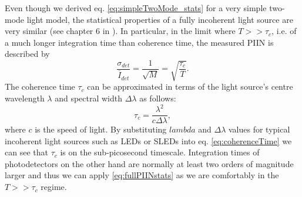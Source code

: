 \documentclass[]{article}
\newcommand*\mean[1]{\overline{#1}}
\begin{document}
	Even though we derived  eq. \ref{eq:simpleTwoMode_stats} for a very simple two-mode light model, the statistical properties of a fully incoherent light source are very similar (see chapter 6 in \cite{goodman_statistical_2000}). In particular, in the limit where $T>>\tau_c$, i.e. of a much longer integration time than coherence time, the measured PIIN is described by
		\begin{equation} 
		\frac{\sigma_{det}}{\mean{I}_{det}} = \frac{1}{\sqrt{M}} = \sqrt{\frac{\tau_c}{T}}.
		\label{eq:fullPIINstats}
		\end{equation}
	The coherence time $\tau_c$ can be approximated in terms of the light source's centre wavelength $\lambda$ and spectral width $\Delta\lambda$ as follows:
		\begin{equation}
		\tau_c = \frac{\lambda^2}{c\Delta\lambda},
		\label{eq:coherenceTime}
		\end{equation}
	where $c$ is the speed of light. By substituting $lambda$ and $\Delta\lambda$ values for typical incoherent light sources such as LEDs or SLEDs into eq. \ref{eq:coherenceTime} we can see that $\tau_c$ is on the sub-picosecond timescale. Integration times of photodetectors on the other hand are normally at least two orders of magnitude larger and thus we can apply \ref{eq:fullPIINstats} as we are comfortably in the $T>>\tau_c$ regime.



\end{document}
